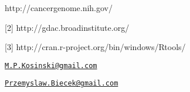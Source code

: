 \begin{Schunk}
\begin{Sinput}
[1] http://cancergenome.nih.gov/

[2] http://gdac.broadinstitute.org/
   
[3] http://cran.r-project.org/bin/windows/Rtools/


\end{Sinput}
\end{Schunk}

\address{
Marcin Kosinski\\
Warsaw University of Technology\\
Faculty of Mathematics and Information Science\\ Koszykowa 75, 00-662 Warsaw, Poland\\
}
\href{mailto:M.P.Kosinski@gmail.com}{\nolinkurl{M.P.Kosinski@gmail.com}}

\address{
Przemyslaw Biecek\\
Warsaw University\\
line 1\\ line 2\\
}
\href{mailto:Przemyslaw.Biecek@gmail.com}{\nolinkurl{Przemyslaw.Biecek@gmail.com}}


